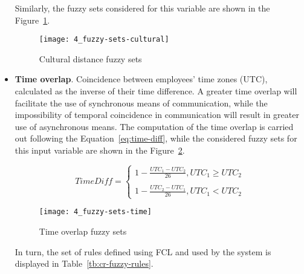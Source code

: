 \begin{itemize}
	Similarly, the fuzzy sets considered for this variable are shown in the Figure~\ref{fig:fs-cultural}.\newline

	\begin{figure}
		\centering
		\texttt{[image: 4\_fuzzy-sets-cultural]}
		\caption[Cultural distance fuzzy sets]{Cultural distance fuzzy sets}
		\label{fig:fs-cultural}
	\end{figure}
	
\item \textbf{Time overlap}. Coincidence between employees’ time zones (UTC), calculated as the inverse of their time difference. A greater time overlap will facilitate the use of synchronous means of communication, while the impossibility of temporal coincidence in communication will result in greater use of asynchronous means. The computation of the time overlap is carried out following the Equation~\ref{eq:time-diff}, while the considered fuzzy sets for this input variable are shown in the Figure~\ref{fig:fs-time}.\newline

	\begin{equation}
		\label{eq:time-diff}
		TimeDiff = \left\{\begin{matrix}
		1 - \frac{UTC_1-UTC_2}{26}, UTC_1 \geq UTC_2
		\\
		\\
		1 - \frac{UTC_2-UTC_1}{26}, UTC_1 < UTC_2
		\end{matrix}\right.
	\end{equation}

	\begin{figure}
		\centering
		\texttt{[image: 4\_fuzzy-sets-time]}
		\caption[Time overlap fuzzy sets]{Time overlap fuzzy sets}
		\label{fig:fs-time}
	\end{figure}

	\vspace{16px}
	In turn, the set of rules defined using FCL and used by the system is displayed in Table~\ref{tb:cr-fuzzy-rules}.\newline
	

\end{itemize}

